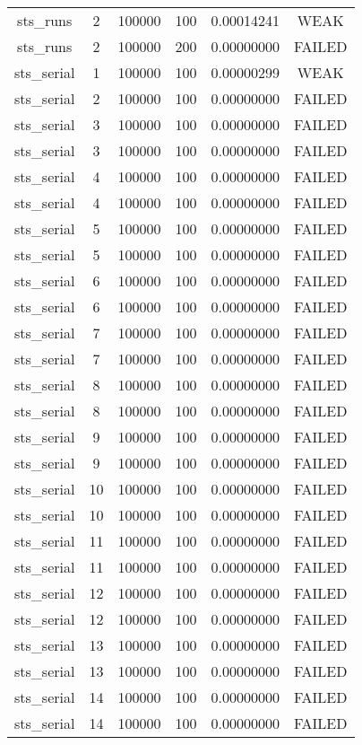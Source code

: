 \begin{longtable}{cccccc}
sts\_runs & 2 & 100000 & 100 & 0.00014241 & WEAK \\
sts\_runs & 2 & 100000 & 200 & 0.00000000 & FAILED \\
sts\_serial & 1 & 100000 & 100 & 0.00000299 & WEAK \\
sts\_serial & 2 & 100000 & 100 & 0.00000000 & FAILED \\
sts\_serial & 3 & 100000 & 100 & 0.00000000 & FAILED \\
sts\_serial & 3 & 100000 & 100 & 0.00000000 & FAILED \\
sts\_serial & 4 & 100000 & 100 & 0.00000000 & FAILED \\
sts\_serial & 4 & 100000 & 100 & 0.00000000 & FAILED \\
sts\_serial & 5 & 100000 & 100 & 0.00000000 & FAILED \\
sts\_serial & 5 & 100000 & 100 & 0.00000000 & FAILED \\
sts\_serial & 6 & 100000 & 100 & 0.00000000 & FAILED \\
sts\_serial & 6 & 100000 & 100 & 0.00000000 & FAILED \\
sts\_serial & 7 & 100000 & 100 & 0.00000000 & FAILED \\
sts\_serial & 7 & 100000 & 100 & 0.00000000 & FAILED \\
sts\_serial & 8 & 100000 & 100 & 0.00000000 & FAILED \\
sts\_serial & 8 & 100000 & 100 & 0.00000000 & FAILED \\
sts\_serial & 9 & 100000 & 100 & 0.00000000 & FAILED \\
sts\_serial & 9 & 100000 & 100 & 0.00000000 & FAILED \\
sts\_serial & 10 & 100000 & 100 & 0.00000000 & FAILED \\
sts\_serial & 10 & 100000 & 100 & 0.00000000 & FAILED \\
sts\_serial & 11 & 100000 & 100 & 0.00000000 & FAILED \\
sts\_serial & 11 & 100000 & 100 & 0.00000000 & FAILED \\
sts\_serial & 12 & 100000 & 100 & 0.00000000 & FAILED \\
sts\_serial & 12 & 100000 & 100 & 0.00000000 & FAILED \\
sts\_serial & 13 & 100000 & 100 & 0.00000000 & FAILED \\
sts\_serial & 13 & 100000 & 100 & 0.00000000 & FAILED \\
sts\_serial & 14 & 100000 & 100 & 0.00000000 & FAILED \\
sts\_serial & 14 & 100000 & 100 & 0.00000000 & FAILED \\

\end{longtable}
